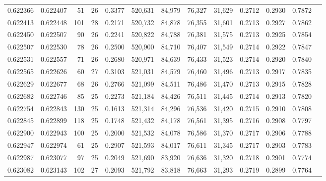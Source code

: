 \begin{tabular}{rrrrrrrrrrrrr}
0.622366 & 0.622407 &  51 &  26 &                                     0.3377 & 520,631 &  84,979 &  76,327 &  31,629 & 0.2712 & 0.2930 & 0.7872 \\
0.622413 & 0.622448 & 101 &  28 &                                     0.2171 & 520,732 &  84,878 &  76,355 &  31,601 & 0.2713 & 0.2927 & 0.7862 \\
0.622450 & 0.622507 &  90 &  26 &                                     0.2241 & 520,822 &  84,788 &  76,381 &  31,575 & 0.2713 & 0.2925 & 0.7854 \\
0.622507 & 0.622530 &  78 &  26 &                                     0.2500 & 520,900 &  84,710 &  76,407 &  31,549 & 0.2714 & 0.2922 & 0.7847 \\
0.622531 & 0.622557 &  71 &  26 &                                     0.2680 & 520,971 &  84,639 &  76,433 &  31,523 & 0.2714 & 0.2920 & 0.7840 \\
0.622565 & 0.622626 &  60 &  27 &                                     0.3103 & 521,031 &  84,579 &  76,460 &  31,496 & 0.2713 & 0.2917 & 0.7835 \\
0.622629 & 0.622677 &  68 &  26 &                                     0.2766 & 521,099 &  84,511 &  76,486 &  31,470 & 0.2713 & 0.2915 & 0.7828 \\
0.622682 & 0.622746 &  85 &  25 &                                     0.2273 & 521,184 &  84,426 &  76,511 &  31,445 & 0.2714 & 0.2913 & 0.7820 \\
0.622754 & 0.622843 & 130 &  25 &                                     0.1613 & 521,314 &  84,296 &  76,536 &  31,420 & 0.2715 & 0.2910 & 0.7808 \\
0.622845 & 0.622899 & 118 &  25 &                                     0.1748 & 521,432 &  84,178 &  76,561 &  31,395 & 0.2716 & 0.2908 & 0.7797 \\
0.622900 & 0.622943 & 100 &  25 &                                     0.2000 & 521,532 &  84,078 &  76,586 &  31,370 & 0.2717 & 0.2906 & 0.7788 \\
0.622947 & 0.622974 &  61 &  25 &                                     0.2907 & 521,593 &  84,017 &  76,611 &  31,345 & 0.2717 & 0.2903 & 0.7783 \\
0.622987 & 0.623077 &  97 &  25 &                                     0.2049 & 521,690 &  83,920 &  76,636 &  31,320 & 0.2718 & 0.2901 & 0.7774 \\
0.623082 & 0.623143 & 102 &  27 &                                     0.2093 & 521,792 &  83,818 &  76,663 &  31,293 & 0.2719 & 0.2899 & 0.7764 \\

\end{tabular}
